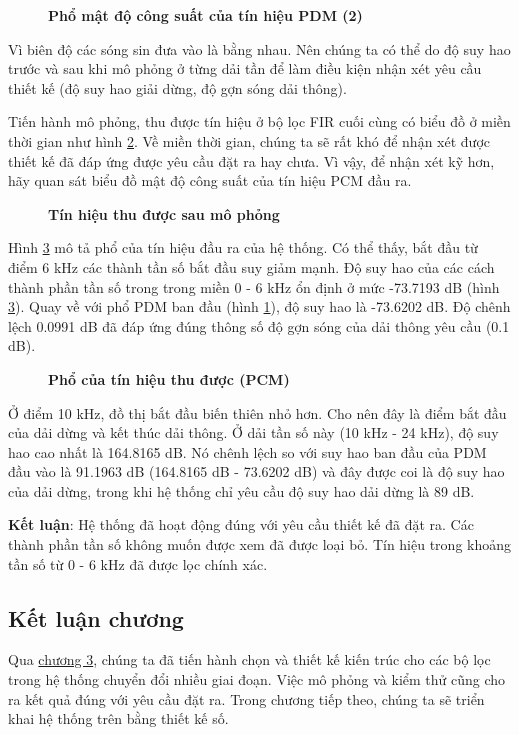 \begin{figure}[H]
    \centering
    
    \caption[Phổ mật độ công suất của tín hiệu PDM (2)]{\bfseries \fontsize{12pt}{0pt}\selectfont Phổ mật độ công suất của tín hiệu PDM (2)}
    \label{sd3}
\end{figure}

Vì biên độ các sóng sin đưa vào là bằng nhau. Nên chúng ta có thể do độ suy hao trước và sau khi mô phỏng ở từng dải tần để làm điều kiện nhận xét yêu cầu thiết kế (độ suy hao giải dừng, độ gợn sóng dải thông).

Tiến hành mô phỏng, thu được tín hiệu ở bộ lọc FIR cuối cùng có biểu đồ ở miền thời gian như hình \ref{pcm_o}. Về miền thời gian, chúng ta sẽ rất khó để nhận xét được thiết kế đã đáp ứng được yêu cầu đặt ra hay chưa. Vì vậy, để nhận xét kỹ hơn, hãy quan sát biểu đồ mật độ công suất của tín hiệu PCM đầu ra.
\begin{figure}[H]
    \centering
    
    \caption[Tín hiệu thu được sau mô phỏng]{\bfseries \fontsize{12pt}{0pt}\selectfont Tín hiệu thu được sau mô phỏng}
    \label{pcm_o}
\end{figure}

Hình \ref{psd_pcm} mô tả phổ của tín hiệu đầu ra của hệ thống. Có thể thấy, bắt đầu từ điểm 6 kHz các thành tần số bắt đầu suy giảm mạnh. Độ suy hao của các cách thành phần tần số trong trong miền 0 - 6 kHz ổn định ở mức -73.7193 dB (hình \ref{psd_pcm}). Quay về với phổ PDM ban đầu (hình \ref{sd3}), độ suy hao là -73.6202 dB. Độ chênh lệch 0.0991 dB đã đáp ứng đúng thông số độ gợn sóng của dải thông yêu cầu (0.1 dB). 
\begin{figure}[H]
    \centering
    
    \caption[Phổ của tín hiệu thu được (PCM)]{\bfseries \fontsize{12pt}{0pt}\selectfont Phổ của tín hiệu thu được (PCM)}
    \label{psd_pcm}
\end{figure}

Ở điểm 10 kHz, đồ thị bắt đầu biến thiên nhỏ hơn. Cho nên đây là điểm bắt đầu của dải dừng và kết thúc dải thông. Ở dải tần số này (10 kHz - 24 kHz), độ suy hao cao nhất là 164.8165 dB. Nó chênh lệch so với suy hao ban đầu của PDM đầu vào là 91.1963 dB (164.8165 dB - 73.6202 dB) và đây được coi là độ suy hao của dải dừng, trong khi hệ thống chỉ yêu cầu độ suy hao dải dừng là 89 dB.

\textbf{Kết luận}: Hệ thống đã hoạt động đúng với yêu cầu thiết kế đã đặt ra. Các thành phần tần số không muốn được xem đã được loại bỏ. Tín hiệu trong khoảng tần số từ 0 - 6 kHz đã được lọc chính xác.


\subsection{Kết luận chương}

Qua \hyperref[chuong3]{chương 3}, chúng ta đã tiến hành chọn và thiết kế kiến trúc cho các bộ lọc trong hệ thống chuyển đổi nhiều giai đoạn. Việc mô phỏng và kiểm thử cũng cho ra kết quả đúng với yêu cầu đặt ra. Trong chương tiếp theo, chúng ta sẽ triển khai hệ thống trên bằng thiết kế số.
\newpage
